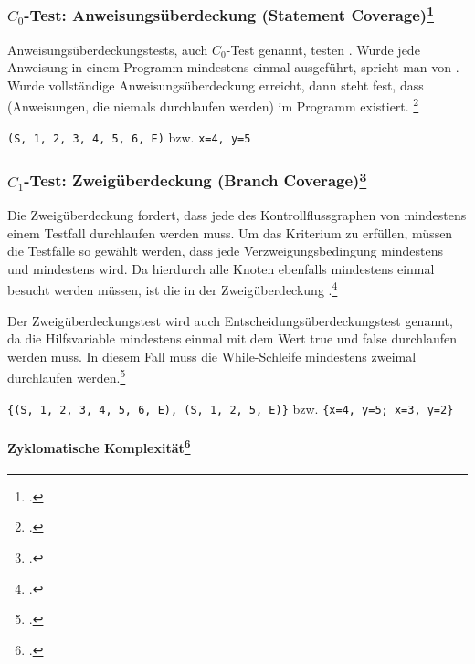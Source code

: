 \documentclass{lehramt-informatik-haupt}
\begin{document}
%

\subsubsection{$C_0$-Test: Anweisungsüberdeckung (Statement Coverage)\footcite[Seite 36]{sosy:fs:5}}

Anweisungsüberdeckungstests, auch $C_0$-Test genannt, testen . Wurde jede Anweisung in einem Programm
mindestens einmal ausgeführt, spricht man von . Wurde vollständige Anweisungsüberdeckung
erreicht, dann steht fest, dass  (Anweisungen,
die niemals durchlaufen werden) im Programm existiert.
\footcite{wiki:kontrollfluss-test}

\texttt{(S, 1, 2, 3, 4, 5, 6, E)}
bzw.
\texttt{x=4, y=5}

%

\subsubsection{$C_1$-Test: Zweigüberdeckung (Branch Coverage)\footcite[Seite 37]{sosy:fs:5}}

Die Zweigüberdeckung fordert, dass jede  des
Kontrollflussgraphen von mindestens einem Testfall durchlaufen werden
muss. Um das Kriterium zu erfüllen, müssen die Testfälle so gewählt
werden, dass jede Verzweigungsbedingung mindestens 
und mindestens  wird. Da hierdurch alle Knoten
ebenfalls mindestens einmal besucht werden müssen, ist die
 in der Zweigüberdeckung .\footcite[Seite 209]{hoffmann:software}

Der Zweigüberdeckungstest wird auch Entscheidungsüberdeckungstest
genannt, da die Hilfsvariable mindestens einmal mit dem Wert true und
false durchlaufen werden muss. In diesem Fall muss die While-Schleife
mindestens zweimal durchlaufen werden.\footcite{wiki:kontrollfluss-test}


\texttt{\{(S, 1, 2, 3, 4, 5, 6, E), (S, 1, 2, 5, E)\}}
bzw.
\texttt{\{x=4, y=5; x=3, y=2\}}

%

\paragraph{Zyklomatische Komplexität\footcite[Seite 38]{sosy:fs:5}}
\end{document}
